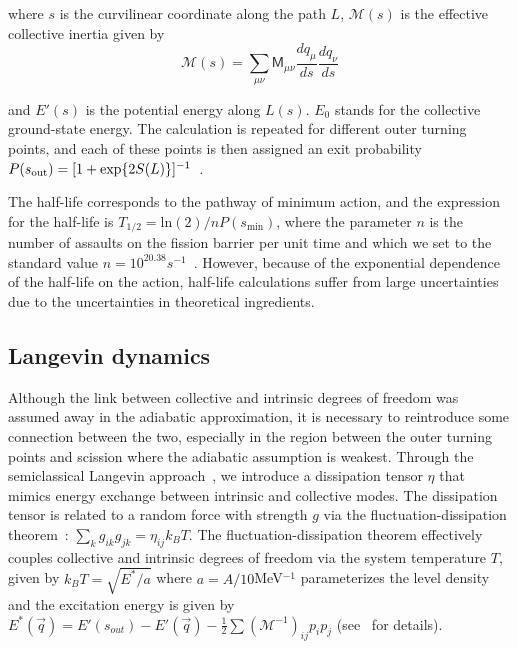 \noindent where $s$ is the curvilinear coordinate along the path $L$, $\mathcal{M}(s)$ is the effective collective inertia given by~\cite{Sadhukhan2013}
\begin{equation}
\mathcal{M}(s) = \sum_{\mu\nu} \mathsf{M}_{\mu\nu} \frac{dq_\mu}{ds} \frac{dq_\nu}{ds}
\end{equation}

\noindent and $E'(s)$ is the potential energy along $L(s)$. $E_0$ stands for the collective ground-state energy. The calculation is repeated for different outer turning points, and each of these points is then assigned an exit probability $P(s_{\rm out})=[1+\exp{2S(L)}]^{-1}$~\cite{Baran1978}. 

The half-life corresponds to the pathway of minimum action, and the expression for the half-life is $T_{1/2} = \mathrm{ln}(2)/nP(s_\mathrm{min})$, where the parameter $n$ is the number of assaults on the fission barrier per unit time and which we set to the standard value $n=10^{20.38} s^{-1}$~\cite{Baran1978}. However, because of the exponential dependence of the half-life on the action, half-life calculations suffer from large uncertainties due to the uncertainties in theoretical ingredients.

\subsection{Langevin dynamics}

Although the link between collective and intrinsic degrees of freedom was assumed away in the adiabatic approximation, it is necessary to reintroduce some connection between the two, especially in the region between the outer turning points and scission where the adiabatic assumption is weakest. Through the semiclassical Langevin approach~\cite{Kubo1966}, we introduce a dissipation tensor $\eta$ that mimics energy exchange between intrinsic and collective modes. The dissipation tensor is related to a random force with strength $g$ via the fluctuation-dissipation theorem~\cite{Callen1951,Kubo1966}: $\sum_k g_{ik}g_{jk} = \eta_{ij}k_BT$. The fluctuation-dissipation theorem effectively couples collective and intrinsic degrees of freedom via the system temperature $T$, given by $k_BT = \sqrt{E^*/a}$ where $a=A/10$MeV$^{-1}$ parameterizes the level density and the excitation energy is given by $E^*(\vec{q}) = E'(s_{out}) - E'(\vec{q}) - \frac{1}{2}\sum\left(\mathcal{M}^{-1}\right)_{ij}p_i p_j$ (see~\cite{Abe1996,Frobrich1998,Sadhukhan2016} for details).

